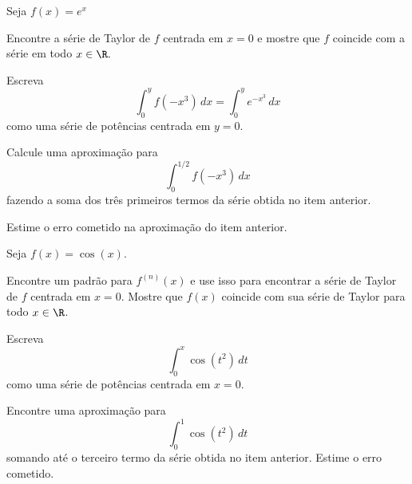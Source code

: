 \begin{exercises*}
\begin{exercise}
  Seja \(f(x)=e^{x}\)
  \begin{alphalist}
    \item Encontre a série de Taylor de $f$ centrada em $x=0$
      e mostre que $f$ coincide com a série em todo $x\in\R.$
    \item Escreva
      \[ \int_0^y f(-x^3)\,dx = \int_0^y e^{-x^3}\,dx \]
      como uma série de potências centrada em $y=0$.
    \item Calcule uma aproximação para
      \[ \int_0^{1/2} f(-x^3)\,dx \]
      fazendo a soma dos três primeiros termos da série obtida no item anterior.
    \item Estime o erro cometido na aproximação do item anterior.
  \end{alphalist}
\end{exercise}

\begin{exercise}
  Seja \( f(x)=\cos(x) \).
  \begin{alphalist}
    \item Encontre um padrão para $f^{(n)}(x)$ e use isso para encontrar a série de Taylor
      de $f$ centrada em $x=0$.
      Mostre que $f(x)$ coincide com sua série de Taylor para todo $x\in\R$.
    \item Escreva
      \[\int_0^x \cos(t^2)\,dt\]
      como uma série de potências centrada em $x=0$.
    \item Encontre uma aproximação para
      \[\int_0^1\cos(t^2)\,dt\]
      somando até o terceiro termo da série obtida no item anterior.
      Estime o erro cometido.
  \end{alphalist}
\end{exercise}


\end{exercises*}
